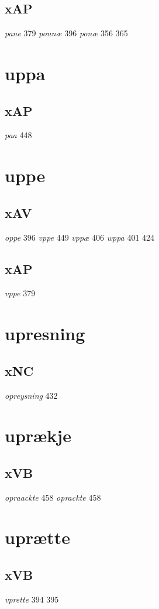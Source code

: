 \documentclass[a4paper,twocolumn]{article}
\begin{document}
\subsection{xAP}
\label{sec:org39817ff}
\emph{pane} 379 \emph{ponnæ} 396 \emph{ponæ} 356 365 
\section{uppa}
\label{sec:orga24d19d}
\subsection{xAP}
\label{sec:org0963495}
\emph{paa} 448 
\section{uppe}
\label{sec:orge12a97d}
\subsection{xAV}
\label{sec:org448adc9}
\emph{oppe} 396 \emph{vppe} 449 \emph{vppæ} 406 \emph{wppa} 401 424 
\subsection{xAP}
\label{sec:orgc02ec7f}
\emph{vppe} 379 
\section{upresning}
\label{sec:orgf222b0f}
\subsection{xNC}
\label{sec:org5c3548f}
\emph{opreysning} 432 
\section{uprækje}
\label{sec:orge0faecc}
\subsection{xVB}
\label{sec:orgea4e568}
\emph{opraackte} 458 \emph{oprackte} 458 
\section{uprætte}
\label{sec:orgac32701}
\subsection{xVB}
\label{sec:org486eac2}
\emph{vprette} 394 395 
\end{document}
